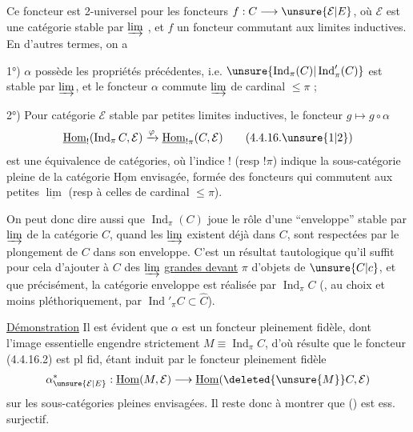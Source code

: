 Ce foncteur est 2-universel pour les foncteurs $f:C\longrightarrow\unsure{\mathcal E|E}$, où $\mathcal E$ est une catégorie stable par  $\varinjlim$ , et $f$ un foncteur commutant aux limites inductives. En d'autres termes, on a

1°) $\alpha$ possède les propriétés précédentes, i.e. $\unsure{\operatorname{Ind}_\pi(C)|\operatorname{Ind}'_\pi(C)}$ est stable par $\varinjlim$,  et le foncteur $\alpha$ commute  $\varinjlim$ de  cardinal $\leq\pi$ ;

2°) Pour  catégorie $\mathcal E$ stable par petites limites inductives, le foncteur $g\longmapsto g\circ\alpha$
\[
\underline{\mathrm{Hom}}_{!}(\operatorname{Ind}_\pi C,\mathcal E)\xrightarrow{\varphi}\underline{\mathrm{Hom}}_{!\pi}(C,\mathcal E)\tag*{(4.4.16.\unsure{1|2})}
\]
est une équivalence de catégories, où l'indice $!$ (resp $!\pi$) indique la sous-catégorie  pleine de la catégorie $\underline{\mathrm{Hom}}$
envisagée, formée des foncteurs qui commutent aux petites $\underline{\lim}$ (resp à celles de cardinal $\leq\pi$).

On peut donc dire aussi que $\operatorname{Ind}_\pi(C)$ joue le rôle d'une ``enveloppe'' stable par  $\varinjlim$ de la catégorie  $C$, quand les $\varinjlim$   existent déjà dans $C$, sont respectées par le plongement de $C$ dans son enveloppe. C'est un résultat  tautologique qu'il suffit pour cela d'ajouter à $C$ des $\varinjlim$ \uline{grandes devant} $\pi$ d'objets de $\unsure{C|c}$, et que  précisément, la catégorie enveloppe est réalisée par $\operatorname{Ind}_\pi C$ (, au choix et moins pléthoriquement, par $\operatorname{Ind}'_\pi C\subset\widehat C$).

\uline{Démonstration}  Il est évident que $\alpha$ est un foncteur pleinement fidèle, dont l'image essentielle engendre strictement $M\equiv\operatorname{Ind}_\pi C$, d'où résulte que le foncteur (4.4.16.2) est pl fid, étant induit par le foncteur pleinement fidèle
\[
\alpha_{\unsure{\mathcal E|E}}^{*}:\underline{\mathrm{Hom}}(M,\mathcal E)\longrightarrow\underline{\mathrm{Hom}}(\deleted{\unsure{M}}C,\mathcal E)
\]
sur les sous-catégories pleines envisagées. Il reste donc à montrer que () est ess. surjectif.

